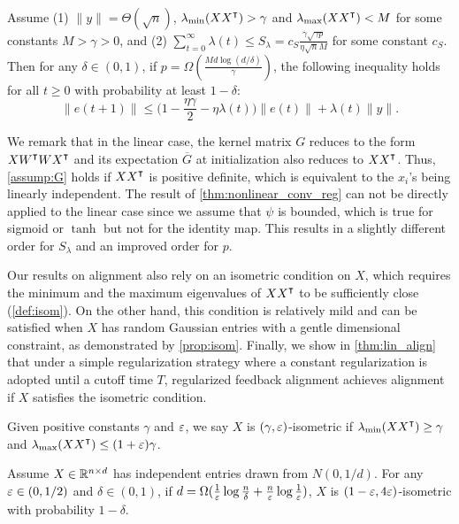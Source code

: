 \begin{theorem}
\label{thm:lin_conv}
Assume \textnormal{(1)}  $\|y\| = \Theta(\sqrt n)$, $\lambda_{\min}(XX\transpose)>\gamma$ and $\lambda_{\max}(XX\transpose)<M$ for some constants $M>\gamma>0$, and \textnormal{(2)} $\sum_{t=0}^\infty \lambda(t) \leq  S_\lambda = c_{S}\frac{\gamma\sqrt{\gamma p}}{\eta\sqrt{n}M}$ for some constant $c_{S}$.
Then for any $\delta\in(0,1)$, if $p = \Omega(\frac{Md\log(d/\delta)}{\gamma})$, the following inequality holds for all $t\geq 0$ with probability at least $1-\delta$:
\begin{equation}
\label{eq:reg_error_bd}
\|e(t+1)\|\leq \big(1-\frac{\eta\gamma}{2}-\eta\lambda(t)\big)\|e(t)\| + \lambda(t)\|y\|.
\end{equation}
\end{theorem}

We remark that in the linear case, the kernel matrix $G$ reduces to the form $X W\transpose W X\transpose$ and its expectation $\overline{G}$ at initialization also reduces to $X X\transpose$. Thus, \cref{assump:G} holds if $XX\transpose$ is positive definite, which is equivalent to the $x_i$'s being linearly independent. The result of \cref{thm:nonlinear_conv_reg} can not be directly applied to the linear case since we assume that $\psi$ is bounded, which is true for sigmoid or $\tanh$ but not for the identity map. This results in a slightly different order for $S_\lambda$ and an improved order for $p$.

Our results on alignment also rely on an isometric condition on $X$, which requires the minimum and the maximum eigenvalues of $XX\transpose$ to be sufficiently close (\cf \cref{def:isom}). On the other hand, this condition is relatively mild and can be satisfied when $X$ has random Gaussian entries with a gentle dimensional constraint, as demonstrated by \cref{prop:isom}. Finally, we show in \cref{thm:lin_align} that under a simple regularization strategy where a constant regularization is adopted until a cutoff time $T$, regularized feedback alignment achieves alignment if $X$ satisfies the isometric condition.
{}
\begin{definition}
\label{def:isom}
Given positive constants $\gamma$ and $\varepsilon$, we say $X$ is $(\gamma, \varepsilon)$-isometric if
$\lambda_{\min}(XX\transpose)\geq\gamma$ and $\lambda_{\max}(XX\transpose)\leq(1+\eps)\gamma$.
\end{definition}

\begin{proposition}
\label{prop:isom}
Assume $X\in\mathbb{R}^{n\times d}$ has independent entries drawn from $N(0,1/d)$. For any $\varepsilon \in (0,1/2)$ and $\delta \in (0,1)$, if $d=\Omega(\frac{1}{\varepsilon}\log\frac{n}{\delta}+\frac{n}{\varepsilon}\log \frac{1}{\varepsilon})$, $X$ is $(1-\varepsilon, 4\varepsilon)$-isometric with probability $1-\delta$.
\end{proposition}

